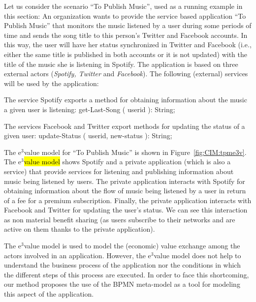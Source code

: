 \documentclass{singlecol-new}
\theoremstyle{TH}{
\newtheorem{lemma}{Lemma}
\newtheorem{theorem}[lemma]{Theorem}
\newtheorem{corrolary}[lemma]{Corrolary}
\newtheorem{conjecture}[lemma]{Conjecture}
\newtheorem{proposition}[lemma]{Proposition}
\newtheorem{claim}[lemma]{Claim}
\newtheorem{stheorem}[lemma]{Wrong Theorem}
\newtheorem{algorithm}{Algorithm}
}
\theoremstyle{THrm}{
\newtheorem{definition}{Definition}[section]
\newtheorem{question}{Question}[section]
\newtheorem{remark}{Remark}
\newtheorem{scheme}{Scheme}
}
\theoremstyle{THhit}{
\newtheorem{case}{Case}[section]
}
\theoremstyle{THhsl}{
\newtheorem{example}{Example}
}
\begin{document}
\begin{example}\label{ex:toPublicMusic}
Let us consider the scenario ``To Publish Music'', used as a running example in this section:
An organization wants to provide the service based application ``To Publish Music'' that monitors the music listened by a user during some periods of time and sends the song title  to this person's Twitter and Facebook accounts.
In this way, the user will have her status synchronized in  Twitter and Facebook (i.e., either the same title is published in both accounts or it is not updated) with the title of the music she is listening in Spotify.
The application is based on three external actors ({\em Spotify, Twitter} and {\em Facebook}).
The following (external) services will be used by the application:

\begin{compactitem}
\item The  service   Spotify exports a meth\-od for obtaining information  about the music a given user is listening:
 {\sf\small get-Last-Song ( userid ): String}; 
\item The services Facebook and Twitter export meth\-ods for  updating the status of a given user:
 {\sf\small update-Status ( userid, new-status ): String};
\end{compactitem}




The e$^3$value model for ``To Publish Music'' is shown in Figure~\ref{fig:CIM:tpme3v}.
The e$^3$\hl{value model} shows Spotify and a private application (which is also a service) that provide services for listening and publishing information about music being listened by users. 
The private application interacts with Spotify for obtaining information about the flow of music being listened by a user in return of a fee for a premium subscription. 
Finally, the private application interacts with Facebook and Twitter for updating the user's status.
We can see this interaction as non material benefit sharing (as users subscribe to their networks and are active on them thanks to the private application).
\end{example}

The e$^3$value  model is used to model the (economic) value exchange among the actors involved in an application.
However, the e$^3$val\-ue model does not help to understand the business process of the application nor the conditions in which the different steps of this process are executed.
In order to face this shortcoming, our method proposes the use of the BPMN meta-model as a tool for modeling this aspect of the application.
\end{document}
